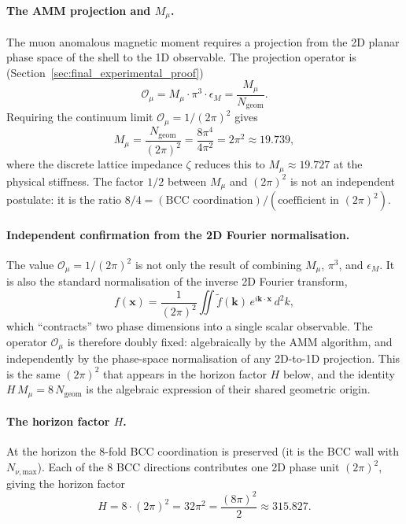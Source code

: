 \documentclass[10pt,a4paper]{article}
\begin{document}
\paragraph{The AMM projection and \(M_\mu\).} The muon anomalous
magnetic moment requires a projection from the 2D planar phase space
of the shell to the 1D observable. The projection operator is
(Section~\ref{sec:final_experimental_proof})
\begin{equation}
	\mathcal{O}_\mu
	= M_\mu \cdot \pi^3 \cdot \epsilon_M
	= \frac{M_\mu}{N_{\text{geom}}}.
	\label{eq:cosmo_O_mu_chain}
\end{equation}
Requiring the continuum limit \(\mathcal{O}_\mu = 1/(2\pi)^2\) gives
\begin{equation}
	M_\mu = \frac{N_{\text{geom}}}{(2\pi)^2}
	= \frac{8\pi^4}{4\pi^2}
	= 2\pi^2
	\approx 19.739,
	\label{eq:cosmo_M_mu}
\end{equation}
where the discrete lattice impedance \(\zeta\) reduces this to
\(M_\mu \approx 19.727\) at the physical stiffness. The factor \(1/2\)
between \(M_\mu\) and \((2\pi)^2\) is not an independent postulate: it
is the ratio \(8/4 = (\text{BCC coordination})/(\text{coefficient in }
(2\pi)^2)\).

\paragraph{Independent confirmation from the 2D Fourier normalisation.}
The value \(\mathcal{O}_\mu = 1/(2\pi)^2\) is not only the result of
combining \(M_\mu\), \(\pi^3\), and \(\epsilon_M\). It is also the
standard normalisation of the inverse 2D Fourier transform,
\begin{equation}
	f(\mathbf{x})
	= \frac{1}{(2\pi)^2}
	\iint \tilde{f}(\mathbf{k})\, e^{i\mathbf{k}\cdot\mathbf{x}}\, d^2k,
	\label{eq:cosmo_2D_fourier}
\end{equation}
which ``contracts'' two phase dimensions into a single scalar
observable. The operator \(\mathcal{O}_\mu\) is therefore doubly
fixed: algebraically by the AMM algorithm, and independently by the
phase-space normalisation of any 2D-to-1D projection. This is the
same \((2\pi)^2\) that appears in the horizon factor \(H\) below,
and the identity \(H\, M_\mu = 8\, N_{\text{geom}}\) is the algebraic
expression of their shared geometric origin.

\paragraph{The horizon factor \(H\).} At the horizon the 8-fold BCC
coordination is preserved (it is the BCC wall with
\(N_{\nu,\text{max}}\)). Each of the 8 BCC directions contributes one
2D phase unit \((2\pi)^2\), giving the horizon factor
\begin{equation}
	H = 8 \cdot (2\pi)^2 = 32\pi^2 = \frac{(8\pi)^2}{2}
	\approx 315.827.
	\label{eq:cosmo_H}
\end{equation}
\end{document}
